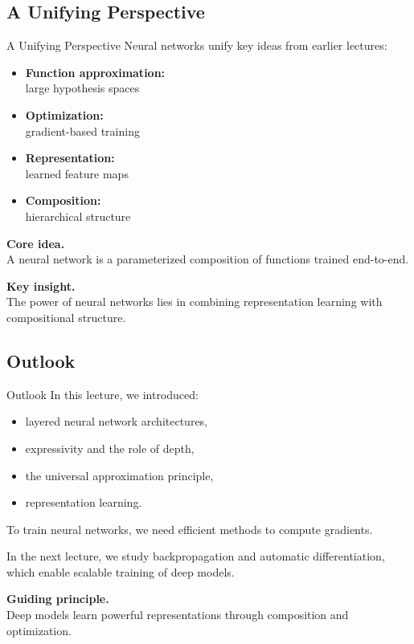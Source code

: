 \documentclass[aspectratio=169,11pt]{beamer}
\begin{document}
\subsection{A Unifying Perspective}
\begin{frame}[t,allowframebreaks]{A Unifying Perspective}
\small
Neural networks unify key ideas from earlier lectures:

\begin{itemize}
    \item \textbf{Function approximation:}\\ large hypothesis spaces
    \item \textbf{Optimization:}\\ gradient-based training
    \item \textbf{Representation:}\\ learned feature maps
    \item \textbf{Composition:}\\ hierarchical structure
\end{itemize}

\textbf{Core idea.}\\ A neural network is a parameterized composition of functions trained end-to-end.

\textbf{Key insight.}\\ The power of neural networks lies in combining representation learning with compositional structure.
\end{frame}

\subsection{Outlook}
\begin{frame}[t,allowframebreaks]{Outlook}
\small
In this lecture, we introduced:

\begin{itemize}
    \item layered neural network architectures,
    \item expressivity and the role of depth,
    \item the universal approximation principle,
    \item representation learning.
\end{itemize}

To train neural networks, we need efficient methods to compute gradients.

In the next lecture, we study backpropagation and automatic differentiation, which enable scalable training of deep models.

\textbf{Guiding principle.}\\ Deep models learn powerful representations through composition and optimization.
\end{frame}
\end{document}
